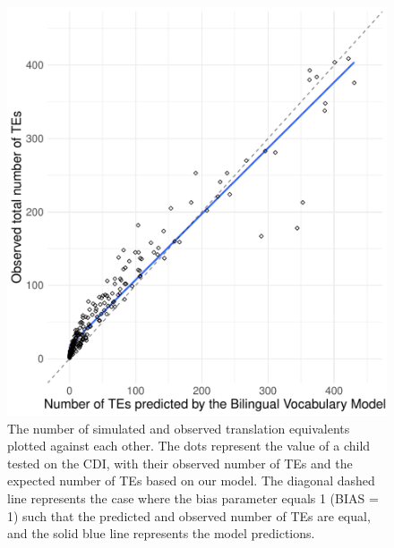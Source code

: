 \documentclass[
  english,
  ,man,floatsintext]{apa6}
\begin{document}
\begin{figure}

{\centering \includegraphics[width=0.7\linewidth,height=0.7\textheight]{paper_TE_bilingual_vocabulary_model_files/figure-latex/fig6-1} 

}

\caption{The number of simulated and observed translation equivalents plotted against each other. The dots represent the value of a child tested on the CDI, with their observed number of TEs and the expected number of TEs based on our model. The diagonal dashed line represents the case where the bias parameter equals 1 (BIAS = 1) such that the predicted and observed number of TEs are equal, and the solid blue line represents the model predictions.}\label{fig:fig6}
\end{figure}
\end{document}
